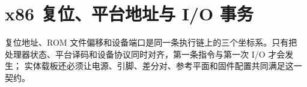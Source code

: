 \chapter{x86 复位、平台地址与 I/O 事务}

\begin{keyidea}
复位地址、ROM 文件偏移和设备端口是同一条执行链上的三个坐标系。只有把
处理器状态、平台译码和设备协议同时对齐，第一条指令与第一次 I/O 才会发生；
实体载板还必须让电源、引脚、差分对、参考平面和固件配置共同满足这一契约。
\end{keyidea}






